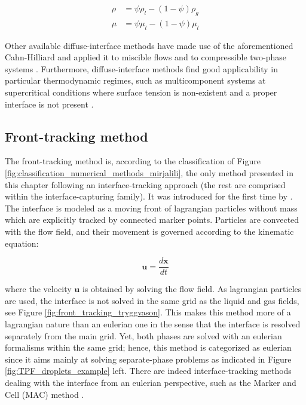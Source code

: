 \begin{subequations}
\begin{align}
\rho &= \psi \rho_l - \left( 1 -  \psi \right) \rho_g  \\
\mu &= \psi \mu_l   - \left( 1 -  \psi \right) \mu_l
\end{align}
\end{subequations}

Other available diffuse-interface methods have made use of the aforementioned Cahn-Hilliard and applied it to miscible flows  and to compressible two-phase systems . Furthermore, diffuse-interface methods find good applicability in particular thermodynamic regimes, such as multicomponent systems at supercritical conditions where surface tension is non-existent and a proper interface is not present . 




\subsection{Front-tracking method}

The front-tracking method is, according to the classification of Figure \ref{fig:classification_numerical_methods_mirjalili}, the only method presented in this chapter following an interface-tracking approach (the rest are comprised within the interface-capturing family). It was introduced for the first time by . The interface is modeled as a moving front of lagrangian particles without mass which are explicitly tracked by connected marker points. Particles are convected with the flow field, and their movement is governed according to the kinematic equation:

\begin{equation}
\textbf{u} = \frac{d \textbf{x}}{d t}
\end{equation}

where the velocity $\textbf{u}$ is obtained by solving the flow field. As lagrangian particles are used, the interface is not solved in the same grid as the liquid and gas fields, see Figure \ref{fig:front_tracking_tryggvason}. This makes this method more of a lagrangian nature than an eulerian one in the sense that the interface is resolved separately from the main grid. Yet, both phases are solved with an eulerian formalisms within the same grid; hence, this method is categorized as eulerian since it aims mainly at solving separate-phase problems as indicated in Figure \ref{fig:TPF_droplets_example} left. There are indeed interface-tracking methods dealing with the interface from an eulerian perspective, such as the Marker and Cell (MAC) method .

